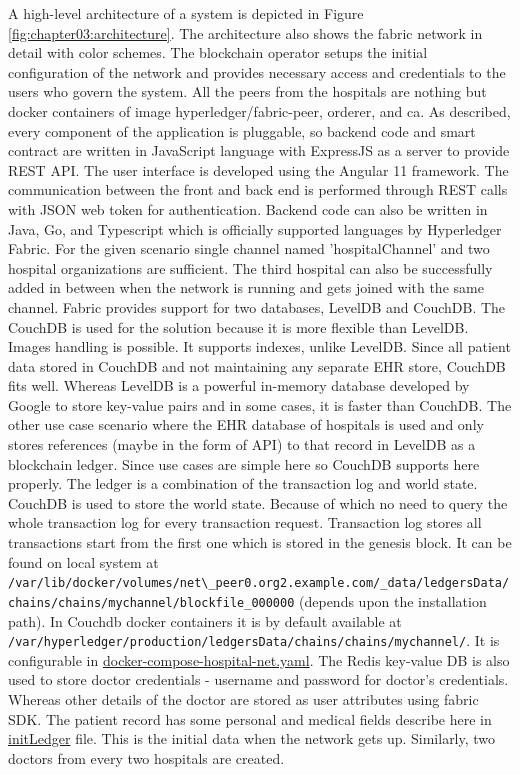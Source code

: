 A high-level architecture of a system is depicted in Figure \ref{fig:chapter03:architecture}. The architecture also shows the fabric network in detail with color schemes. The blockchain operator setups the initial configuration of the network and provides necessary access and credentials to the users who govern the system. All the peers from the hospitals are nothing but docker containers of image hyperledger/fabric-peer, orderer, and ca. As described, every component of the application is pluggable, so backend code and smart contract are written in JavaScript language with ExpressJS as a server to provide REST API. The user interface is developed using the Angular 11 framework. The communication between the front and back end is performed through REST calls with JSON web token for authentication. Backend code can also be written in Java, Go, and Typescript which is officially supported languages by Hyperledger Fabric. For the given scenario single channel named 'hospitalChannel' and two hospital organizations are sufficient. The third hospital can also be successfully added in between when the network is running and gets joined with the same channel. 
Fabric provides support for two databases, LevelDB and CouchDB. The CouchDB is used for the solution because it is more flexible than LevelDB. Images handling is possible. It supports indexes, unlike LevelDB. Since all patient data stored in CouchDB and not maintaining any separate EHR store, CouchDB fits well. Whereas LevelDB is a powerful in-memory database developed by Google to store key-value pairs and in some cases, it is faster than CouchDB. The other use case scenario where the EHR database of hospitals is used and only stores references (maybe in the form of API) to that record in LevelDB as a blockchain ledger. Since use cases are simple here so CouchDB supports here properly. The ledger is a combination of the transaction log and world state. CouchDB is used to store the world state. Because of which no need to query the whole transaction log for every transaction request. Transaction log stores all transactions start from the first one which is stored in the genesis block. It can be found on local system at
\lstinline{/var/lib/docker/volumes/net\_peer0.org2.example.com/_data/ledgersData/chains/chains/mychannel/blockfile_000000} (depends upon the installation path). In Couchdb docker containers it is by default available at \lstinline{/var/hyperledger/production/ledgersData/chains/chains/mychannel/}. It is configurable in \href{https://github.com/kshitijyelpale/blockchain-hyperledger-fabric-electronic-patient-records/blob/main/app/first-network/docker/docker-compose-hospital-net.yaml}{docker-compose-hospital-net.yaml}. 
The Redis key-value DB is also used to store doctor credentials - username and password for doctor's credentials. Whereas other details of the doctor are stored as user attributes using fabric SDK.
The patient record has some personal and medical fields describe here in \href{https://github.com/kshitijyelpale/blockchain-hyperledger-fabric-electronic-patient-records/blob/main/app/patient-asset-transfer/chaincode/lib/initLedger.json}{initLedger} file. This is the initial data when the network gets up. Similarly, two doctors from every two hospitals are created.


